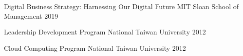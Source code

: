 

\begin{cvhonors}

  \cvhonor
    {Digital Business Strategy: Harnessing Our Digital Future} %
    {MIT Sloan School of Management} %
    {} %
    {2019} %

  \cvhonor
    {Leadership Development Program} %
    {National Taiwan University} %
    {} %
    {2012} %

  \cvhonor
    {Cloud Computing Program} %
    {National Taiwan University} %
    {} %
    {2012} %

\end{cvhonors}
